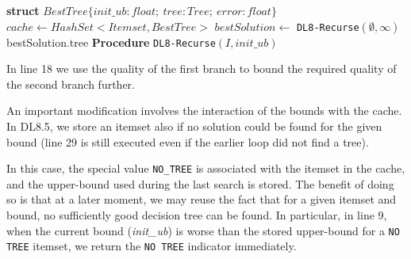 \newcommand{\trmtt}[1]{\textrm{\texttt{#1}}}
\begin{algorithm}
	\DontPrintSemicolon
	\caption{$DL8.5(maxdepth, minsup)$}
	\label{algo:2}
	\label{algo:1}
	\textbf{struct} $BestTree\{init\_ub : float;\ tree: Tree;\ error : float\}$\;
	$cache \gets HashSet < Itemset, BestTree >$\;
	$bestSolution \gets$ \verb|DL8-Recurse|$(\emptyset, \infty)$\;
	\Return bestSolution.tree\;
	\textbf{Procedure} \texttt{DL8-Recurse}$(I, init\_ub)$\;
\end{algorithm}
In line 18 we use the quality of the first branch to bound the required quality of the second branch further.

An important modification involves the interaction of the bounds with the cache. In DL8.5, we store an itemset also if no solution could be found for the given bound (line 29 is still executed even if the earlier loop did not find a tree).

In this case, the special value \verb|NO_TREE| is associated with the itemset in the cache, and the upper-bound used during the last search is stored. The benefit of doing so is that at a later moment, we may reuse the fact that for a given itemset and bound, no sufficiently good decision tree can be found. In particular, in line 9, when the current bound (\emph{init\_ub}) is worse than the stored upper-bound for a \verb|NO TREE| itemset, we return the \verb|NO TREE| indicator immediately.

